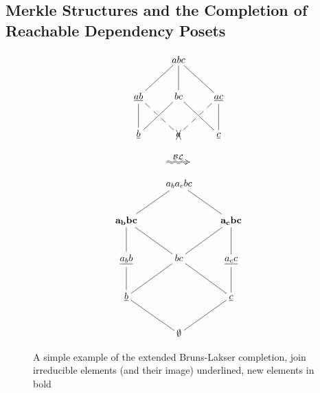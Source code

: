\documentclass[hoptionsi,review,format=acmsmall]{acmart}
\theoremstyle{definition}
\newcommand{\BLc}{\mathcal{BL}}
\begin{document}
\subsection{Merkle Structures and the Completion of Reachable Dependency Posets}


\begin{figure}
\begin{minipage}[c]{0.3\textwidth}
\begin{equation*}
    \xymatrix{& abc \ar@{-}[dl] \ar@{-}[d] \ar@{-}[dr] & \\
      \underline{ab} \ar@{-}[d] \ar@{--}[dr] & bc \ar@{-}[dl] \ar@{-}[dr] &
        \underline{ac} \ar@{-}[d] \ar@{--}[dl] \\
        \underline{b} & \xcancel{a}  & \underline{c} }         
\end{equation*}
\end{minipage}
\begin{minipage}[c]{0.08\textwidth}
  \begin{equation*}
    \xymatrix{\ar@2{~>}[r]^{\BLc} &}
  \end{equation*}
\end{minipage}
\begin{minipage}[c]{0.3\textwidth}
\begin{equation*}
    \xymatrix{& a_ba_cbc \ar@{-}[dl]  \ar@{-}[dr] & \\
      \mathbf{a_bbc} \ar@{-}[d] \ar@{-}[dr] & &
        \mathbf{a_cbc} \ar@{-}[d] \ar@{-}[dl]\\
        \underline{a_bb} \ar@{-}[d] & bc \ar@{-}[dl] \ar@{-}[dr] &
          \underline{a_cc} \ar@{-}[d] \\
         \underline{b} \ar@{-}[dr] & & \underline{c} \ar@{-}[dl] \\
      & \mathbf{\emptyset} }
\end{equation*}
\end{minipage}
\caption{A simple example of the extended Bruns-Lakser completion, join irreducible elements (and their image) underlined, new elements in bold}
\label{Fig1}
\end{figure}

\end{document}
